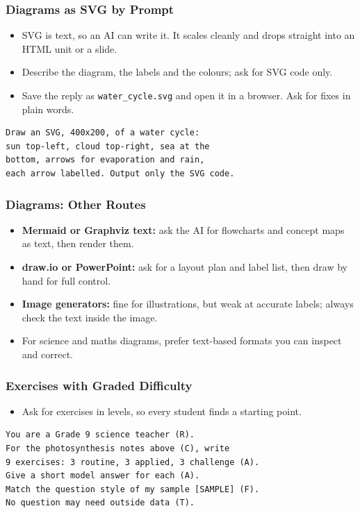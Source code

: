 \begin{frame}[fragile]\frametitle{Diagrams as SVG by Prompt}
\begin{itemize}
\item SVG is text, so an AI can write it. It scales cleanly and drops straight into an HTML unit or a slide.
\item Describe the diagram, the labels and the colours; ask for SVG code only.
\item Save the reply as \texttt{water\_cycle.svg} and open it in a browser. Ask for fixes in plain words.
\end{itemize}
\begin{lstlisting}[language=HTML]
Draw an SVG, 400x200, of a water cycle:
sun top-left, cloud top-right, sea at the
bottom, arrows for evaporation and rain,
each arrow labelled. Output only the SVG code.
\end{lstlisting}
\end{frame}

\begin{frame}[fragile]\frametitle{Diagrams: Other Routes}
\begin{itemize}
\item \textbf{Mermaid or Graphviz text:} ask the AI for flowcharts and concept maps as text, then render them.
\item \textbf{draw.io or PowerPoint:} ask for a layout plan and label list, then draw by hand for full control.
\item \textbf{Image generators:} fine for illustrations, but weak at accurate labels; always check the text inside the image.
\item For science and maths diagrams, prefer text-based formats you can inspect and correct.
\end{itemize}
\end{frame}

\begin{frame}[fragile]\frametitle{Exercises with Graded Difficulty}
\begin{itemize}
\item Ask for exercises in levels, so every student finds a starting point.
\end{itemize}
\begin{lstlisting}[language=HTML]
You are a Grade 9 science teacher (R).
For the photosynthesis notes above (C), write
9 exercises: 3 routine, 3 applied, 3 challenge (A).
Give a short model answer for each (A).
Match the question style of my sample [SAMPLE] (F).
No question may need outside data (T).
\end{lstlisting}
\end{frame}

